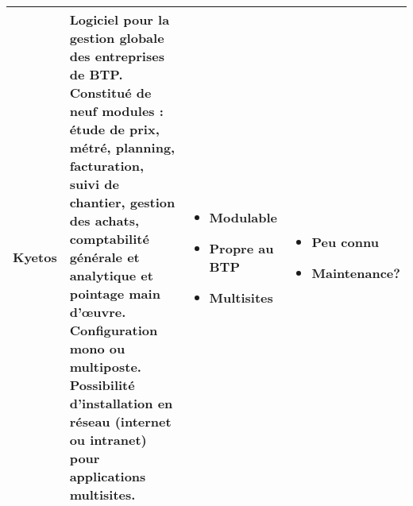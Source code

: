 \begin{center}
\begin{tabular}{|p{1cm}|p{7cm}|p{3.3cm}|p{3.3cm}|}
 Kyetos   &
Logiciel pour la gestion globale des entreprises de BTP. Constitué de neuf modules : étude de prix, métré, planning, facturation,
 suivi de chantier, gestion des achats, comptabilité générale et analytique et pointage main d’œuvre. 
Configuration mono ou multiposte. Possibilité d'installation en réseau (internet ou intranet) pour applications multisites. &
\begin{itemize}
  \item Modulable
  \item Propre au BTP
  \item Multisites
 \end{itemize} &
  \begin{itemize}
  \item Peu connu
  \item Maintenance? 
 \end{itemize}\\ \hline

 
\end{tabular}
\end{center}

